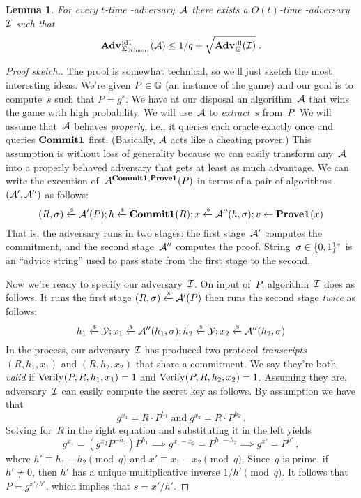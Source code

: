 \documentclass{article}
\newtheorem{lemma}{Lemma}
\theoremstyle{remark}
\begin{document}
\begin{lemma}\label{lemma:dl->id1}
  For every $t$-time -adversary~$\mathcal{A}$ there exists a $O(t)$-time
  \dl-adversary~$\mathcal{I}$ such that
  \begin{equation}
    \Adv{\id1}_\Schnorr(\A) \leq 1/q + \sqrt{\Adv{\dl}_\G(\I)}
    \;.
  \end{equation}
\end{lemma}
\begin{proof}[Proof sketch.]
  The proof is somewhat technical, so we'll just sketch the most interesting
  ideas.
  We're given $P\in\mathbb{G}$ (an instance of the \dl game) and our goal is to
  compute~$s$ such that $P=g^s$. We have at our disposal an algorithm~$\mathcal{A}$ that
  wins the  game with high probability. We will use~$\mathcal{A}$ to
  \emph{extract}~$s$ from~$P$.
  We will assume that~$\mathcal{A}$ behaves \emph{properly}, i.e., it queries each oracle
  exactly once and queries $\textup{\textbf{Commit1}}\hspace{0.5pt}$ first. (Basically, $\mathcal{A}$ acts like a
  cheating prover.) This assumption is without loss of generality because we can
  easily transform any~$\mathcal{A}$ into a properly behaved adversary that gets at least
  as much advantage.
  We can write the execution of~$\mathcal{A}^{\textup{\textbf{Commit1}}\hspace{0.5pt},\textup{\textbf{Prove1}}\hspace{0.5pt}}(P)$ in terms of a pair of
  algorithms $(\mathcal{A}',\mathcal{A}'')$ as follows:
  \[
    (R, \sigma) \xleftarrow{\text{\tiny{\$}}} \mathcal{A}'(P);
    h \xleftarrow{\text{\tiny{\$}}} \textup{\textbf{Commit1}}\hspace{0.5pt}(R);
    x \xleftarrow{\text{\tiny{\$}}} \mathcal{A}''(h,\sigma);
    v \gets \textup{\textbf{Prove1}}\hspace{0.5pt}(x)
  \]
  That is, the adversary runs in two stages: the first stage~$\mathcal{A}'$ computes the
  commitment, and the second stage~$\mathcal{A}''$ computes the proof.
  String~$\sigma\in\{0,1\}^*$ is an ``advice string'' used to pass state from
  the first stage to the second.

  Now we're ready to specify our \dl adversary~$\mathcal{I}$. On input of~$P$,
  algorithm~$\mathcal{I}$ does as follows.
  It runs the first stage $(R, \sigma) \xleftarrow{\text{\tiny{\$}}} \mathcal{A}'(P)$ then runs the second stage
  \emph{twice} as follows:
  \[
    h_1 \xleftarrow{\text{\tiny{\$}}} \mathcal{Y};
    x_1 \xleftarrow{\text{\tiny{\$}}} \mathcal{A}''(h_1,\sigma);
    h_2 \xleftarrow{\text{\tiny{\$}}} \mathcal{Y};
    x_2 \xleftarrow{\text{\tiny{\$}}} \mathcal{A}''(h_2,\sigma)
  \]
  In the process, our adversary~$\mathcal{I}$ has produced two protocol
  \emph{transcripts} $(R,h_1,x_1)$ and $(R,h_2,x_2)$ that share a commitment.
  We say they're both \emph{valid} if $\textnormal{Verify}\hspace{0.33pt}(P,R,h_1,x_1)=1$ and
  $\textnormal{Verify}\hspace{0.33pt}(P,R,h_2,x_2)=1$. Assuming they are, adversary~$\mathcal{I}$ can easily compute
  the secret key as follows.
  By assumption we have that
  \begin{equation}
    g^{x_1} = R \cdot P^{h_1} \;\text{and}\; g^{x_2} = R \cdot P^{h_2} \,.
  \end{equation}
  Solving for~$R$ in the right equation and substituting it in the left yields
  \begin{equation}
    g^{x_1} = ({g^{x_2}}{P^{-h_2}})P^{h_1} \implies
    {g^{x_1-x_2}} = {P^{h_1-h_2}} \implies
      g^{x'} = P^{h'} \,,
  \end{equation} where $h' \equiv h_1 - h_2 \pmod q$ and $x' \equiv x_1 - x_2
  \pmod q$.
  Since~$q$ is prime, if $h'\ne0$, then $h'$ has a unique multiplicative inverse
  $1/h' \pmod q$. It follows that $P = g^{x'/h'}$, which implies that $s =
  x'/h'$.


\end{proof}
\end{document}
